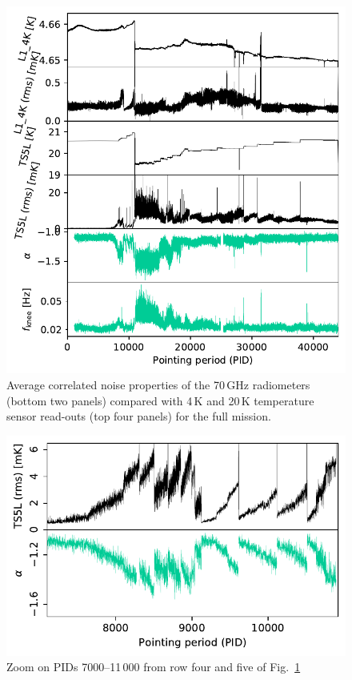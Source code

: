 \documentclass{aa}
\begin{document}
\begin{figure}
        \begin{center}
                \includegraphics[width=\linewidth]{figs/hk_band_TS5L_070.pdf}
        \end{center}
        \caption{Average correlated noise properties of the 70\,GHz radiometers
          (bottom two panels) compared with 4\,K and 20\,K temperature sensor
          read-outs (top four panels) for the full mission.
                \label{fig:hk_TSL_70_full}}
\end{figure}

\begin{figure}
        \begin{center}
                \includegraphics[width=\linewidth]{figs/hk_band_TS5L_070_zoom.pdf}
        \end{center}
        \caption{Zoom on PIDs 7000--11\,000 from row four and five of Fig.~\ref{fig:hk_TSL_70_full}  \label{fig:hk_TSL_70_zoom}}
\end{figure}
\end{document}
